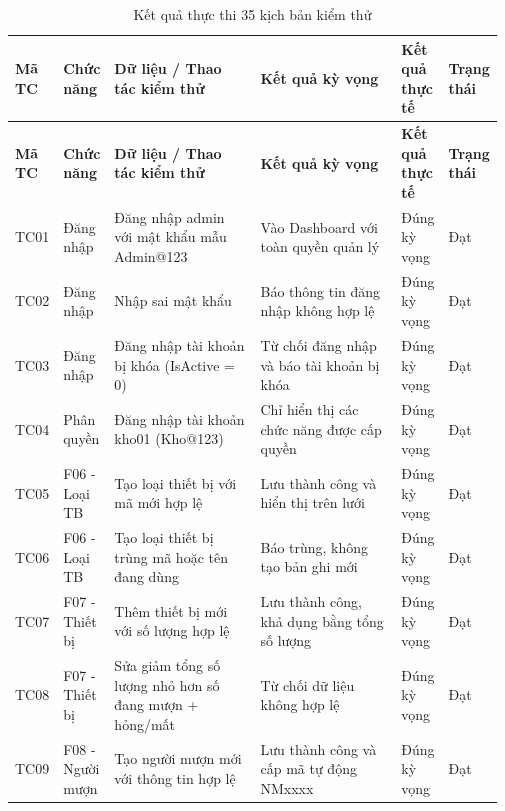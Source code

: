{\small\setlength{\tabcolsep}{3pt}\renewcommand{\arraystretch}{1.25}
\begin{longtable}{|>{\raggedright\arraybackslash}p{0.046\linewidth}|>{\raggedright\arraybackslash}p{0.092\linewidth}|>{\raggedright\arraybackslash}p{0.339\linewidth}|>{\raggedright\arraybackslash}p{0.327\linewidth}|>{\raggedright\arraybackslash}p{0.098\linewidth}|>{\raggedright\arraybackslash}p{0.069\linewidth}|}
\caption{Kết quả thực thi 35 kịch bản kiểm thử}\\
\hline
\rowcolor{gray!25}\textbf{\textbf{Mã TC}} & \textbf{\textbf{Chức năng}} & \textbf{\textbf{Dữ liệu / Thao tác kiểm thử}} & \textbf{\textbf{Kết quả kỳ vọng}} & \textbf{\textbf{Kết quả thực tế}} & \textbf{\textbf{Trạng thái}} \\ \hline
\endfirsthead
\hline
\rowcolor{gray!25}\textbf{\textbf{Mã TC}} & \textbf{\textbf{Chức năng}} & \textbf{\textbf{Dữ liệu / Thao tác kiểm thử}} & \textbf{\textbf{Kết quả kỳ vọng}} & \textbf{\textbf{Kết quả thực tế}} & \textbf{\textbf{Trạng thái}} \\ \hline
\endhead
\hline\endfoot
TC01 & Đăng nhập & Đăng nhập admin với mật khẩu mẫu Admin@123 & Vào Dashboard với toàn quyền quản lý & Đúng kỳ vọng & Đạt \\ \hline
TC02 & Đăng nhập & Nhập sai mật khẩu & Báo thông tin đăng nhập không hợp lệ & Đúng kỳ vọng & Đạt \\ \hline
TC03 & Đăng nhập & Đăng nhập tài khoản bị khóa (IsActive = 0) & Từ chối đăng nhập và báo tài khoản bị khóa & Đúng kỳ vọng & Đạt \\ \hline
TC04 & Phân quyền & Đăng nhập tài khoản kho01 (Kho@123) & Chỉ hiển thị các chức năng được cấp quyền & Đúng kỳ vọng & Đạt \\ \hline
TC05 & F06 - Loại TB & Tạo loại thiết bị với mã mới hợp lệ & Lưu thành công và hiển thị trên lưới & Đúng kỳ vọng & Đạt \\ \hline
TC06 & F06 - Loại TB & Tạo loại thiết bị trùng mã hoặc tên đang dùng & Báo trùng, không tạo bản ghi mới & Đúng kỳ vọng & Đạt \\ \hline
TC07 & F07 - Thiết bị & Thêm thiết bị mới với số lượng hợp lệ & Lưu thành công, khả dụng bằng tổng số lượng & Đúng kỳ vọng & Đạt \\ \hline
TC08 & F07 - Thiết bị & Sửa giảm tổng số lượng nhỏ hơn số đang mượn + hỏng/mất & Từ chối dữ liệu không hợp lệ & Đúng kỳ vọng & Đạt \\ \hline
TC09 & F08 - Người mượn & Tạo người mượn mới với thông tin hợp lệ & Lưu thành công và cấp mã tự động NMxxxx & Đúng kỳ vọng & Đạt \\ \hline

\end{longtable}}
